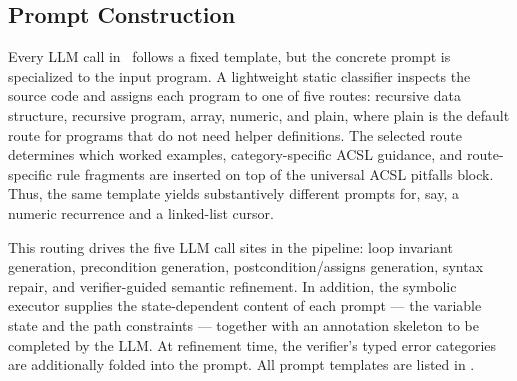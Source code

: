 \subsection{Prompt Construction}
\label{sec:prompt}

\noindent
Every LLM call in \toolname\ follows a fixed template, but the concrete prompt is specialized to the input program. A lightweight static classifier inspects the source code and assigns each program to one of five routes: recursive data structure, recursive program, array, numeric, and plain, where plain is the default route for programs that do not need helper definitions. The selected route determines which worked examples, category-specific ACSL guidance, and route-specific rule fragments are inserted on top of the universal ACSL pitfalls block. Thus, the same template yields substantively different prompts for, say, a numeric recurrence and a linked-list cursor.

This routing drives the five LLM call sites in the pipeline: loop invariant generation, precondition generation, postcondition/assigns generation, syntax repair, and verifier-guided semantic refinement. In addition, the symbolic executor supplies the state-dependent content of each prompt --- the variable state and the path constraints --- together with an annotation skeleton to be completed by the LLM. At refinement time, the verifier's typed error categories are additionally folded into the prompt. All prompt templates are listed in .
